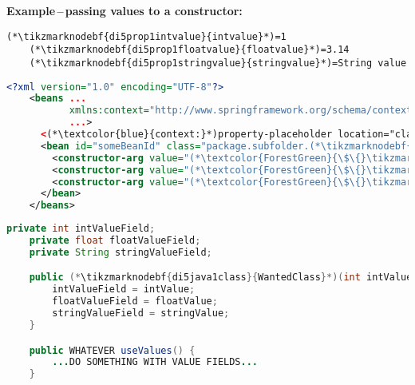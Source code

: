 \vspace{\baselineskip}
\noindent \textbf{Example\,--\,passing values to a constructor:}
\begin{lstlisting}[title={A \textit{.properties} file called \tikzmarknodebf{di5prop1filename}{\textit{constructor.properties}}}]
    (*\tikzmarknodebf{di5prop1intvalue}{intvalue}*)=1
    (*\tikzmarknodebf{di5prop1floatvalue}{floatvalue}*)=3.14
    (*\tikzmarknodebf{di5prop1stringvalue}{stringvalue}*)=String value
\end{lstlisting}
\begin{lstlisting}[language=XML, title={Configuration XML}]
    <?xml version="1.0" encoding="UTF-8"?>
    <beans ...
           xmlns:context="http://www.springframework.org/schema/context"
           ...>
      <(*\textcolor{blue}{context:}*)property-placeholder location="classpath:(*\tikzmarknodebf{di5xml1filename}{constructor.properties}[ForestGreen]*)"/>
      <bean id="someBeanId" class="package.subfolder.(*\tikzmarknodebf{di5xml1class}{WantedClass}[ForestGreen]*)">
        <constructor-arg value="(*\textcolor{ForestGreen}{\$\{}\tikzmarknodebf{di5xml1intvalue}{intvalue}[ForestGreen]\textcolor{ForestGreen}{\}}*)"/>
        <constructor-arg value="(*\textcolor{ForestGreen}{\$\{}\tikzmarknodebf{di5xml1floatvalue}{floatvalue}[ForestGreen]\textcolor{ForestGreen}{\}}*)"/>
        <constructor-arg value="(*\textcolor{ForestGreen}{\$\{}\tikzmarknodebf{di5xml1stringvalue}{stringvalue}[ForestGreen]\textcolor{ForestGreen}{\}}*)"/>
      </bean>
    </beans>
\end{lstlisting}
\begin{lstlisting}[language=Java, title={Wanted class with the constructor}]
    private int intValueField;
    private float floatValueField;
    private String stringValueField;

    public (*\tikzmarknodebf{di5java1class}{WantedClass}*)(int intValue, float floatValue, String stringValue) {
        intValueField = intValue;
        floatValueField = floatValue;
        stringValueField = stringValue;
    }

    public WHATEVER useValues() {
        ...DO SOMETHING WITH VALUE FIELDS...
    }
\end{lstlisting}
\newpage

